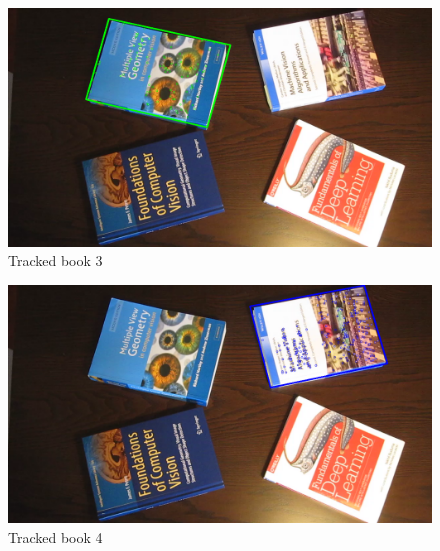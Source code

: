 \documentclass[a4paper,11pt]{article}
\begin{document}
\begin{figure}[h]
    \centering
    \includegraphics[width=\textwidth]{imgs/TrackedFeatures2.png}
    \caption{Tracked book 3}
    \label{fig:book3}
\end{figure}

\begin{figure}[h]
    \centering
    \includegraphics[width=\textwidth]{imgs/TrackedFeatures3.png}
    \caption{Tracked book 4}
    \label{fig:book4}
\end{figure}
\end{document}
